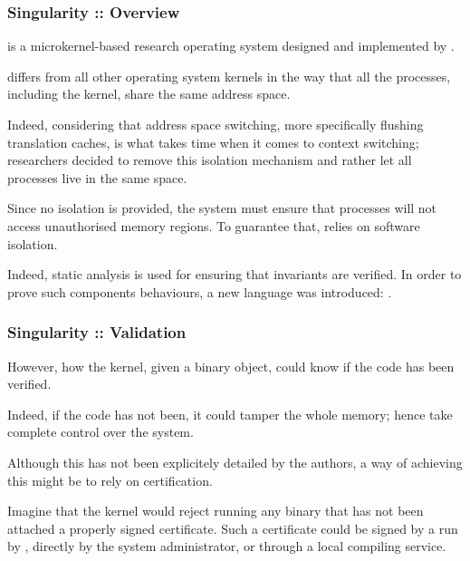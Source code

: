 
\begin{frame}
  \frametitle{Singularity :: Overview}

   is a microkernel-based research operating system designed
  and implemented by .

  \-

   differs from all other operating system kernels in the
  way that all the processes, including the kernel, share the same address
  space.

  \-

  Indeed, considering that address space switching, more specifically flushing
  translation caches, is what takes time when it comes to context switching;
   researchers decided to remove this isolation mechanism
  and rather let all processes live in the same space.

  \-

  Since no isolation is provided, the system must ensure that processes will
  not access unauthorised memory regions. To guarantee that, 
  relies on software isolation.

  \-

  Indeed, static analysis is used for ensuring that invariants are verified.
  In order to prove such components behaviours, a new language was introduced:
  .
\end{frame}


\begin{frame}
  \frametitle{Singularity :: Validation}

  However, how the kernel, given a binary object, could know if the code
  has been verified.

  \-

  Indeed, if the code has not been, it could tamper the whole memory; hence
  take complete control over the system.

  \-

  Although this has not been explicitely detailed by the authors,
  a way of achieving this might be to rely on certification.

  \-

  Imagine that the kernel would reject running any binary that has not been
  attached a properly signed certificate. Such a certificate could be signed
  by a  run by ,
  directly by the system administrator, or through a local compiling service.
\end{frame}

